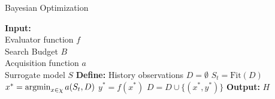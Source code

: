 

\begin{algorithm}[H]
\caption{Bayesian Optimization}
\label{alg:bo}
\begin{algorithmic}[1]
\STATE \textbf{Input:}\\
\hspace{1em}Evaluator function $f$\\
\hspace{1em}Search Budget $B$\\
\hspace{1em}Acquisition function $a$\\
\hspace{1em}Surrogate model $S$
\STATE \textbf{Define:} History observations $D = \emptyset$
        \STATE $S_t = \text{Fit}(D)$ 
        \STATE $x^* = \operatorname*{argmin}_{x\in \chi} a(S_t, D)$ 
        \STATE $y^* = f(x^*)$
        \STATE $D = D \cup \{(x^*, y^*)\}$
    \ENDFOR
\STATE \textbf{Output:} $H$
\end{algorithmic}
\end{algorithm}